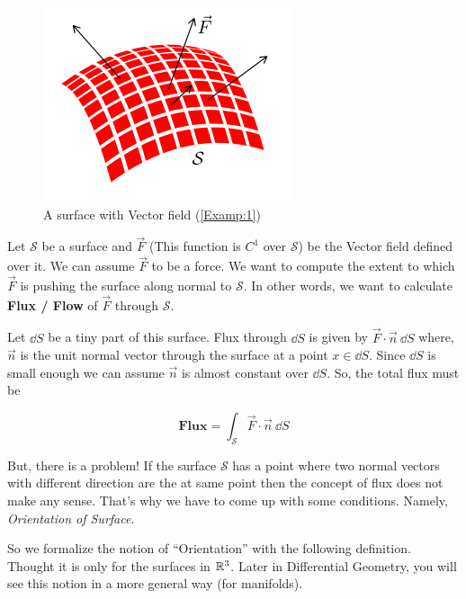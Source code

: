 \documentclass[../Analysis-3.tex]{subfiles}
\begin{document}
\begin{tcolorbox} \label{Examp:1}

  \begin{figure}
    \centering
    \includegraphics[width=.78\linewidth]{../figures/lec-26.3.png}
    \caption{A surface with Vector field (\ref{Examp:1})}
  \end{figure}

  Let $\mathcal{S}$ be a surface and $\vec{F}$ (This function is $C^1$ over $\mathcal{S}$) be the Vector field defined over it. We can assume $\vec{F}$ to be a force. We want to compute the extent to which $\vec{F}$ is pushing the surface along normal to $\mathcal{S}$. In other words, we want to calculate \textbf{Flux / Flow} of $\vec{F}$ through $\mathcal{S}$.

  \vspace{0.2cm}

  Let $\dd S$ be a tiny part of  this surface. Flux through $\dd S$ is given by $\vec{F}\cdot\vec{n}\ \dd S$ where, $\vec{n}$ is the unit normal vector through the surface at a point $x \in \dd S$. Since $\dd S$ is small enough we can assume $\vec{n}$ is almost constant over $\dd S$. So, the total flux must be

  \[ \textbf{Flux} = \int_{\mathcal{S}} \vec{F}\cdot\vec{n}\ \dd S \]

  But, there is a problem! If the surface $\mathcal{S}$ has a point where two normal vectors with different direction are the at same point then the concept of flux does not make any sense. That's why we have to come up with some conditions. Namely, \textit{Orientation of Surface}.

\end{tcolorbox}

So we formalize the notion of ``Orientation'' with the following definition. Thought it is only for the surfaces in $ \mathbb{R}^3 $. Later in Differential Geometry, you will see this notion in a more general way (for manifolds).
\end{document}
